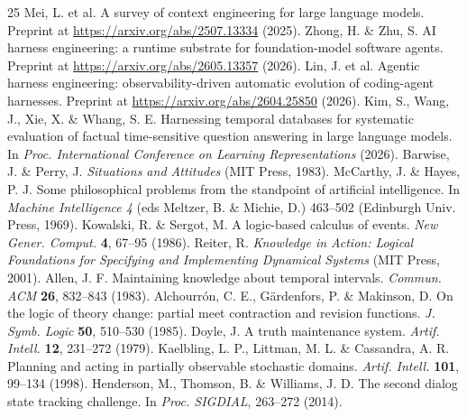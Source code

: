 \begin{thebibliography}{25}
 Mei, L. et al. A survey of context engineering for large language models. Preprint at \url{https://arxiv.org/abs/2507.13334} (2025).
 Zhong, H. \& Zhu, S. AI harness engineering: a runtime substrate for foundation-model software agents. Preprint at \url{https://arxiv.org/abs/2605.13357} (2026).
 Lin, J. et al. Agentic harness engineering: observability-driven automatic evolution of coding-agent harnesses. Preprint at \url{https://arxiv.org/abs/2604.25850} (2026).
 Kim, S., Wang, J., Xie, X. \& Whang, S. E. Harnessing temporal databases for systematic evaluation of factual time-sensitive question answering in large language models. In \emph{Proc. International Conference on Learning Representations} (2026).
 Barwise, J. \& Perry, J. \emph{Situations and Attitudes} (MIT Press, 1983).
 McCarthy, J. \& Hayes, P. J. Some philosophical problems from the standpoint of artificial intelligence. In \emph{Machine Intelligence 4} (eds Meltzer, B. \& Michie, D.) 463--502 (Edinburgh Univ. Press, 1969).
 Kowalski, R. \& Sergot, M. A logic-based calculus of events. \emph{New Gener. Comput.} \textbf{4}, 67--95 (1986).
 Reiter, R. \emph{Knowledge in Action: Logical Foundations for Specifying and Implementing Dynamical Systems} (MIT Press, 2001).
 Allen, J. F. Maintaining knowledge about temporal intervals. \emph{Commun. ACM} \textbf{26}, 832--843 (1983).
 Alchourr\'{o}n, C. E., G\"ardenfors, P. \& Makinson, D. On the logic of theory change: partial meet contraction and revision functions. \emph{J. Symb. Logic} \textbf{50}, 510--530 (1985).
 Doyle, J. A truth maintenance system. \emph{Artif. Intell.} \textbf{12}, 231--272 (1979).
 Kaelbling, L. P., Littman, M. L. \& Cassandra, A. R. Planning and acting in partially observable stochastic domains. \emph{Artif. Intell.} \textbf{101}, 99--134 (1998).
 Henderson, M., Thomson, B. \& Williams, J. D. The second dialog state tracking challenge. In \emph{Proc. SIGDIAL}, 263--272 (2014).

\end{thebibliography}
